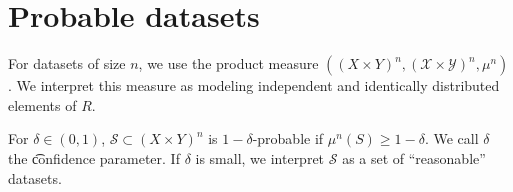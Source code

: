 \section*{Probable datasets}

For datasets of size $n$, we use the product measure $((X \times  Y)^n, (\mathcal{X}  \times  \mathcal{Y} )^n, \mu ^n)$.
We interpret this measure as modeling independent and identically distributed elements of $R$.

For $\delta  \in (0, 1)$, $\mathcal{S}  \subset (X \times Y)^n$ is \t{$1 - \delta $-probable} if $\mu ^n(S) \geq 1 - \delta $.
We call $\delta $ the \t{confidence parameter}.
If $\delta $ is small, we interpret $\mathcal{S} $ as a set of ``reasonable'' datasets.
